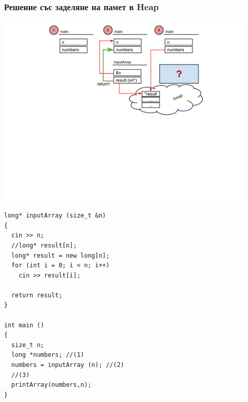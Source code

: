 \documentclass{beamer}
\begin{document}
\begin{frame}[fragile]
\frametitle{Решение със заделяне на памет в Heap}


\includegraphics[width=12.5cm]{images/heap}

\vspace{-200px}
\begin{flushleft}
\begin{lstlisting}
long* inputArray (size_t &n)
{ 
  cin >> n;
  //long* result[n];
  long* result = new long[n];
  for (int i = 0; i < n; i++)
    cin >> result[i];

  return result;
}

int main ()
{
  size_t n;
  long *numbers; //(1)
  numbers = inputArray (n); //(2)
  //(3) 
  printArray(numbers,n);
}

\end{lstlisting}  
\end{flushleft}

\end{frame}
\end{document}
